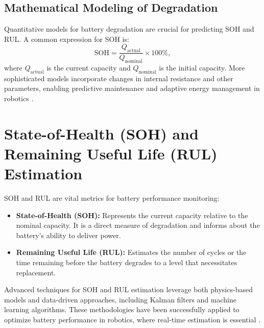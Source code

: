 \subsection{Mathematical Modeling of Degradation}
Quantitative models for battery degradation are crucial for predicting SOH and RUL. A common expression for SOH is:
\begin{equation}
\text{SOH} = \frac{Q_{\text{actual}}}{Q_{\text{nominal}}} \times 100\%,
\end{equation}
where \(Q_{\text{actual}}\) is the current capacity and \(Q_{\text{nominal}}\) is the initial capacity. More sophisticated models incorporate changes in internal resistance and other parameters, enabling predictive maintenance and adaptive energy management in robotics \cite{Roscher2011}.

\section{State-of-Health (SOH) and Remaining Useful Life (RUL) Estimation}
SOH and RUL are vital metrics for battery performance monitoring:
\begin{itemize}
    \item \textbf{State-of-Health (SOH):} Represents the current capacity relative to the nominal capacity. It is a direct measure of degradation and informs about the battery's ability to deliver power.
    \item \textbf{Remaining Useful Life (RUL):} Estimates the number of cycles or the time remaining before the battery degrades to a level that necessitates replacement.
\end{itemize}
Advanced techniques for SOH and RUL estimation leverage both physics-based models and data-driven approaches, including Kalman filters and machine learning algorithms. These methodologies have been successfully applied to optimize battery performance in robotics, where real-time estimation is essential \cite{Rauf2022,Rahman2024}.


